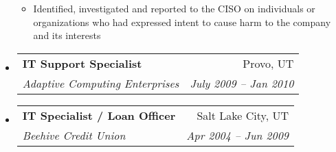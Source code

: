 \documentclass[letterpaper,11pt]{article}
\makeatletter
\newcommand{\resitem}[1]{\item #1 \vspace{-2pt}}
\newcommand{\ressubheading}[4]{
\begin{tabular*}{6.5in}{l@{\extracolsep{\fill}}r}
		\textbf{#1} & #2 \\
		\textit{#3} & \textit{#4} \\
\end{tabular*}\vspace{-6pt}}
\makeatother
\begin{document}
\begin{itemize}
{\begin{itemize}
					\resitem{Identified, investigated and reported to the CISO on individuals or organizations who had expressed intent to cause harm to the company and its interests}
				\end{itemize}
				}
		\item 
			\ressubheading{IT Support Specialist}{Provo, UT}{Adaptive Computing Enterprises}{July 2009 -- Jan 2010}
\begin{comment}
				{ \footnotesize
				\begin{itemize}
					\resitem{Responsible for setup, deployment, and ongoing maintenance of 80+ desktop systems running Windows and Ubuntu Linux}
					\resitem{Prepared systems for global user conference, administration and deployment of secured Samba file server, research and purchasing decision for new VoIP equipment}
				\end{itemize}
				}
\end{comment}
		\item
			\ressubheading{IT Specialist / Loan Officer}{Salt Lake City, UT}{Beehive Credit Union}{Apr 2004 -- Jun 2009}
\begin{comment}
				{ \footnotesize
				\begin{itemize}
					\resitem{Advised Board of Directors on selecting and deploying \$100k VoIP telephone system}
					\resitem{Team lead for project implementing VPN failover connections at 9 branches for disaster recovery purposes}
					\resitem{Developed and wrote ATM security procedures manual for the entire credit union}
					\resitem{Performed fraud prevention and detection as first backup to the BSA (Bank Secrecy Act) Officer}
				\end{itemize}
	          		}
\end{comment}
\begin{comment}
		\item
			\ressubheading{Owner/Photographer}{Salt Lake City, UT}{Matchless Images}{2004 -- 2012}
			{ \footnotesize
			\begin{itemize}
				\resitem{Handle photography and video services for a national nursing organization, including coverage of annual national conferences}
				\resitem{Provide volunteer photography service for non-profit, charity focused roller derby league in Salt Lake City}
			\end{itemize}
			}
\end{comment}
	\end{itemize}  %
\end{document}
